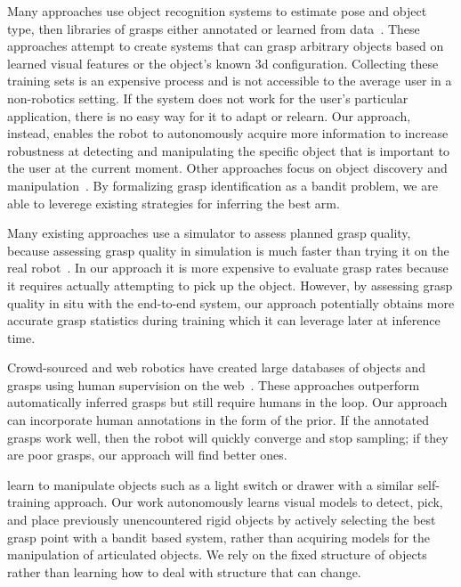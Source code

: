 \documentclass{article}
\begin{document}
Many  approaches use object recognition systems to estimate pose and
object type, then libraries of grasps either annotated or learned from
data~\citep{saxena08, goldfeder09, morales03,ciocarlie14}.  These
approaches attempt to create systems that can grasp arbitrary objects
based on learned visual features or the object's known 3d
configuration.  Collecting these training sets is an expensive process
and is not accessible to the average user in a non-robotics
setting. If the system does not work for the user's particular
application, there is no easy way for it to adapt or relearn.  Our
approach, instead, enables the robot to autonomously acquire more
information to increase robustness at detecting and manipulating the
specific object that is important to the user at the current moment.
Other approaches focus on object discovery and
manipulation~\citep{lyubova13, kraft10, collet14, schiebener12}.  By
formalizing grasp identification as a bandit problem, we are able to
leverege existing strategies for inferring the best arm.

Many existing approaches use a simulator to assess planned grasp
quality, because assessing grasp quality in simulation is much faster
than trying it on the real robot~\citep{miller04}.  In our approach
it is more expensive to evaluate grasp rates because it
requires actually attempting to pick up the object.  However, by
assessing grasp quality in situ with the end-to-end system, our approach
potentially obtains more accurate grasp statistics 
during training which it can leverage later at inference time.

Crowd-sourced and web robotics have created large databases of objects
and grasps using human supervision on the web~\citep{kent14a, kent14}.
These approaches outperform automatically inferred grasps but still
require humans in the loop.  Our approach can incorporate human
annotations in the form of the prior.  If the annotated grasps work
well, then the robot will quickly converge and stop sampling; if they
are poor grasps, our approach will find better ones.

\citet{nguyen14} learn to manipulate objects such as a light switch or drawer
with a similar self-training approach.  Our work autonomously learns visual
models to detect, pick, and place previously unencountered rigid objects by actively
selecting the best grasp point with a bandit based system, rather than
acquiring models for the manipulation of articulated objects. We rely on
the fixed structure of objects rather than learning how to deal
with structure that can change.
\end{document}
